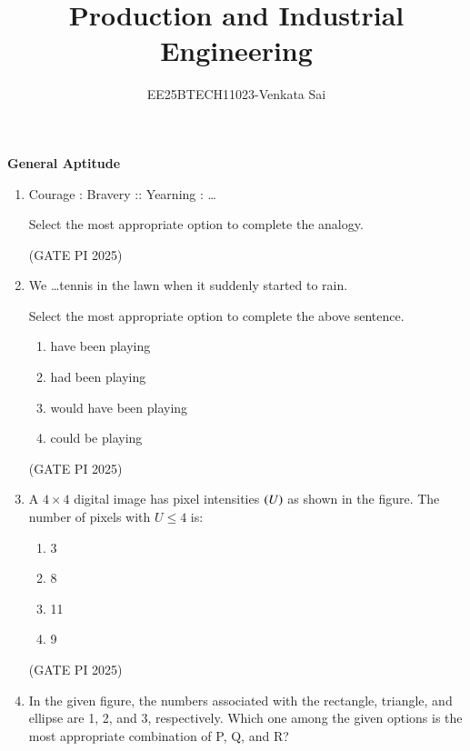 \documentclass[journal,12pt,onecolumn]{IEEEtran}
\title{Production and Industrial Engineering}
\author{EE25BTECH11023-Venkata Sai}
\theoremstyle{remark}
\begin{document}
\maketitle
\textbf{General Aptitude}

\begin{enumerate}
    \item Courage : Bravery :: Yearning : \dots

Select the most appropriate option to complete the analogy.
\begin{enumerate}
\end{enumerate}
\hfill (GATE PI 2025)

\item We \dots tennis in the lawn when it suddenly started to rain.

Select the most appropriate option to complete the above sentence.

\begin{enumerate}
\item have been playing
\item had been playing
\item would have been playing
\item could be playing
\end{enumerate}

\hfill (GATE PI 2025)

\item A $4\times4$ digital image has pixel intensities $\left(U\right)$ as shown in the figure. The number of pixels with $U\le 4$ is:



\begin{enumerate}
\item 3
\item 8
\item 11
\item 9
\end{enumerate}

\hfill (GATE PI 2025)

\item In the given figure, the numbers associated with the rectangle, triangle, and ellipse are 1, 2, and 3, respectively. Which one among the given options is the most appropriate combination of P, Q, and R?


\end{enumerate}
\end{document}
